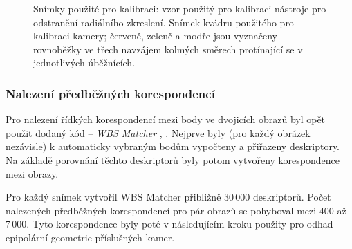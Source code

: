 \documentclass[11pt,oneside,a4paper,pdftex]{article}   %
\begin{document}
	\begin{figure}[htb]
		\centering
		\caption{Snímky použité pro kalibraci:  vzor použitý
			pro kalibraci nástroje pro odstranění radiálního zkreslení.
			 Snímek kvádru použitého pro
			kalibraci kamery; červeně, zeleně a modře jsou vyznačeny rovnoběžky ve třech
			navzájem kolmých směrech protínající se v jednotlivých úběžnících.}
	\end{figure}

\subsubsection{Nalezení předběžných korespondencí} Pro nalezení řídkých korespondencí mezi body ve
dvojicích obrazů byl opět použit dodaný kód -- \emph{WBS Matcher} \cite{code_repo},
\cite{WBS_Matcher}.  Nejprve byly (pro každý obrázek nezávisle) k automaticky vybraným
 bodům vypočteny a přiřazeny deskriptory. Na základě porovnání těchto deskriptorů byly
potom vytvořeny korespondence mezi obrazy.

Pro každý snímek vytvořil WBS Matcher přibližně 30\,000 deskriptorů. Počet nalezených předběžných
korespondencí pro pár obrazů se pohyboval mezi 400 až 7\,000. Tyto korespondence byly poté v
následujícím kroku použity pro odhad epipolární geometrie pří\-slu\-šných kamer.
\end{document}
